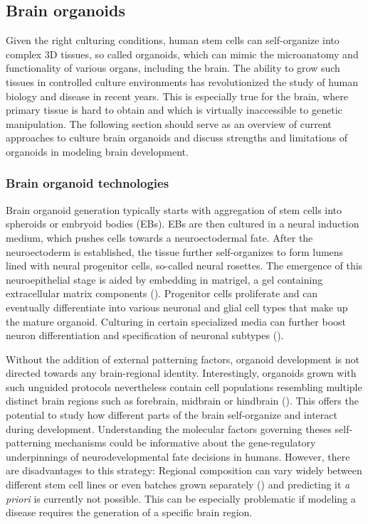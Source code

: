 \subsection{Brain organoids}

Given the right culturing conditions, human stem cells can self-organize into complex 3D tissues, so called organoids, which can mimic the microanatomy and functionality of various organs, including the brain. The ability to grow such tissues in controlled culture environments has revolutionized the study of human biology and disease in recent years. This is especially true for the brain, where primary tissue is hard to obtain and which is virtually inaccessible to genetic manipulation. The following section should serve as an overview of current approaches to culture brain organoids and discuss strengths and limitations of organoids in modeling brain development.


\subsubsection{Brain organoid technologies}
Brain organoid generation typically starts with aggregation of stem cells into spheroids or embryoid bodies (EBs). EBs are then cultured in a neural induction medium, which pushes cells towards a neuroectodermal fate. After the neuroectoderm is established, the tissue further self-organizes to form lumens lined with neural progenitor cells, so-called neural rosettes. The emergence of this neuroepithelial stage is aided by embedding in matrigel, a gel containing extracellular matrix components (\cite{lancaster_cerebral_2013,eiraku_self-organizing_2011}). Progenitor cells proliferate and can eventually differentiate into various neuronal and glial cell types that make up the mature organoid. Culturing in certain specialized media can further boost neuron differentiation and specification of neuronal subtypes (\cite{bardy_neuronal_2015}). 

Without the addition of external patterning factors, organoid development is not directed towards any brain-regional identity. Interestingly, organoids grown with such unguided protocols nevertheless contain cell populations resembling multiple distinct brain regions such as forebrain, midbrain or hindbrain (\cite{lancaster_cerebral_2013,kadoshima_self-organization_2013}). This offers the potential to study how different parts of the brain self-organize and interact during development. Understanding the molecular factors governing theses self-patterning mechanisms could be 
informative about the gene-regulatory underpinnings of neurodevelopmental fate decisions in humans. However, there are disadvantages to this strategy: Regional composition can vary widely between different stem cell lines or even batches grown separately (\cite{kanton_organoid_2019}) and predicting it \textit{a priori} is currently not possible. This can be especially problematic if modeling a disease requires the generation of a specific brain region.

